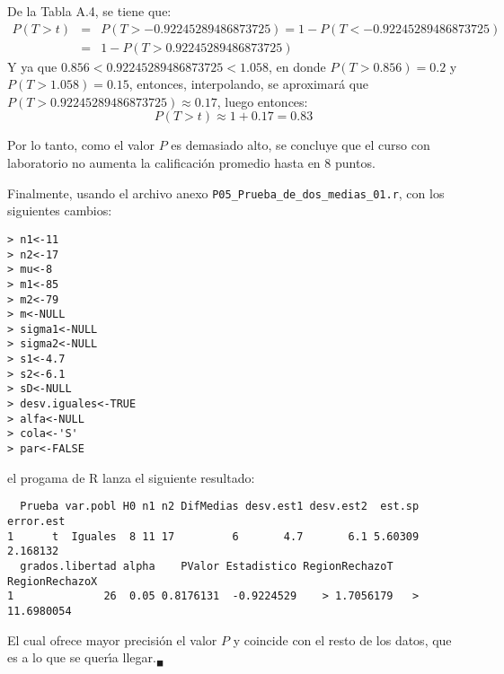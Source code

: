 \begin{solucion}
 \begin{valorp}
  De la Tabla A.4, se tiene que:
  \begin{eqnarray*}
   P(T > t) & = & P(T > -0.92245289486873725) = 1 - P(T < -0.92245289486873725) \\
   & = & 1 - P(T > 0.92245289486873725)
  \end{eqnarray*}
  Y ya que $0.856 < 0.92245289486873725 < 1.058$, en donde $P(T > 0.856) = 0.2$ y $P(T > 1.058) = 0.15$, entonces, interpolando, se aproximar\'a que $P(T > 0.92245289486873725) \approx 0.17$, luego entonces:
  \begin{equation*}
   P(T > t) \approx 1 + 0.17 = 0.83
  \end{equation*}
 \end{valorp}

 \begin{conclusion}
  Por lo tanto, como el valor $P$ es demasiado alto, se concluye que el curso con laboratorio no aumenta la calificaci\'on promedio hasta en $8$ puntos.
 \end{conclusion}

 Finalmente, usando el archivo anexo
 \texttt{P05\_Prueba\_de\_dos\_medias\_01.r},
 con los siguientes cambios:
 \begin{verbatim}
> n1<-11
> n2<-17
> mu<-8
> m1<-85
> m2<-79
> m<-NULL
> sigma1<-NULL
> sigma2<-NULL
> s1<-4.7
> s2<-6.1
> sD<-NULL
> desv.iguales<-TRUE
> alfa<-NULL
> cola<-'S'
> par<-FALSE
 \end{verbatim}
 \vspace{-0.5cm}
 el progama de R lanza el siguiente resultado:
 \begin{verbatim}
  Prueba var.pobl H0 n1 n2 DifMedias desv.est1 desv.est2  est.sp error.est
1      t  Iguales  8 11 17         6       4.7       6.1 5.60309  2.168132
  grados.libertad alpha    PValor Estadistico RegionRechazoT RegionRechazoX
1              26  0.05 0.8176131  -0.9224529    > 1.7056179   > 11.6980054
 \end{verbatim}
 \vspace{-0.5cm}
 El cual ofrece mayor precisi\'on el valor $P$
 y coincide con el resto de los datos,
 que es a lo que se quer\'{\i}a llegar.${}_{\blacksquare}$
\end{solucion}
